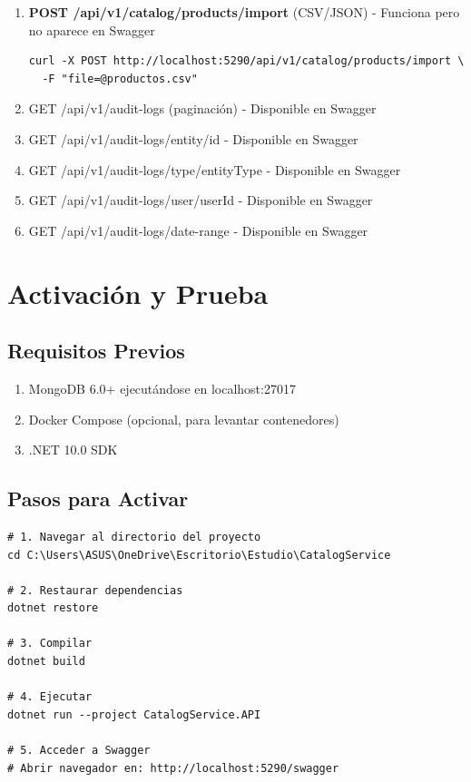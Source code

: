\documentclass[12pt,a4paper]{article}
\begin{document}
\begin{enumerate}
    \item \textbf{POST /api/v1/catalog/products/import} (CSV/JSON) - Funciona pero no aparece en Swagger
    \begin{lstlisting}
curl -X POST http://localhost:5290/api/v1/catalog/products/import \
  -F "file=@productos.csv"
    \end{lstlisting}
    
    \item GET /api/v1/audit-logs (paginación) - Disponible en Swagger
    \item GET /api/v1/audit-logs/entity/{id} - Disponible en Swagger
    \item GET /api/v1/audit-logs/type/{entityType} - Disponible en Swagger
    \item GET /api/v1/audit-logs/user/{userId} - Disponible en Swagger
    \item GET /api/v1/audit-logs/date-range - Disponible en Swagger
\end{enumerate}

\section{Activación y Prueba}

\subsection{Requisitos Previos}

\begin{enumerate}
    \item MongoDB 6.0+ ejecutándose en localhost:27017
    \item Docker Compose (opcional, para levantar contenedores)
    \item .NET 10.0 SDK
\end{enumerate}

\subsection{Pasos para Activar}

\begin{lstlisting}
# 1. Navegar al directorio del proyecto
cd C:\Users\ASUS\OneDrive\Escritorio\Estudio\CatalogService

# 2. Restaurar dependencias
dotnet restore

# 3. Compilar
dotnet build

# 4. Ejecutar
dotnet run --project CatalogService.API

# 5. Acceder a Swagger
# Abrir navegador en: http://localhost:5290/swagger
\end{lstlisting}
\end{document}
